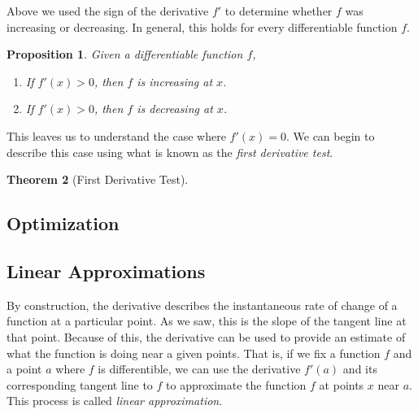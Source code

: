 \documentclass[12pt]{article}
\newtheorem{thm}{Theorem}[section]
\newtheorem{prop}[thm]{Proposition}
\theoremstyle{definition}
\theoremstyle{plain}
\numberwithin{equation}{section}
\begin{document}


Above we used the sign of the derivative $f'$ to determine whether $f$ was increasing or decreasing. In general, this holds for every differentiable function $f$.

\begin{prop}
Given a differentiable function $f$,
\begin{enumerate}
  \item If $f'(x)>0$, then $f$ is increasing at $x$.
  \item If $f'(x)>0$, then $f$ is decreasing at $x$.
\end{enumerate}
\end{prop}

This leaves us to understand the case where $f'(x)=0$. We can begin to describe this case using what is known as the \emph{first derivative test}.

\begin{thm}[First Derivative Test]

\end{thm}







\subsection{Optimization}



\subsection{Linear Approximations}

By construction, the derivative describes the instantaneous rate of change of a function at a particular point. As we saw, this is the slope of the tangent line at that point. Because of this, the derivative can be used to provide an estimate of what the function is doing near a given points. That is, if we fix a function $f$ and a point $a$ where $f$ is differentible, we can use the derivative $f'(a)$ and its corresponding tangent line to $f$ to approximate the function $f$ at points $x$ near $a$. This process is called \emph{linear approximation}.
\end{document}
